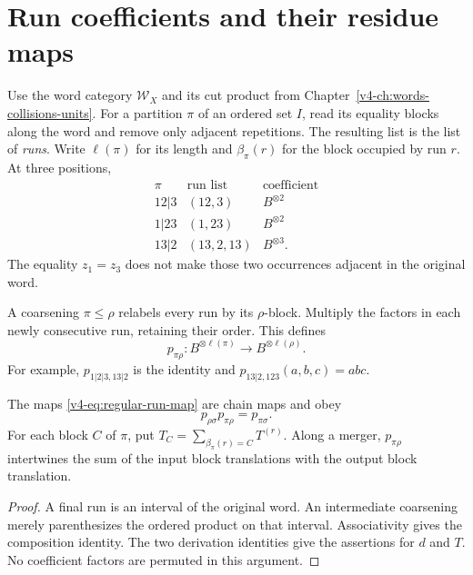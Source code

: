 \section{Run coefficients and their residue maps}
\label{v4-sec:regular-runs}

Use the word category \(\mathcal W_X\) and its cut product
from Chapter~\ref{v4-ch:words-collisions-units}.
For a partition \(\pi\) of an ordered set \(I\), read its
equality blocks along the word and remove only adjacent
repetitions. The resulting list is the list of \emph{runs}.
Write \(\ell(\pi)\) for its length and \(\beta_\pi(r)\)
for the block occupied by run \(r\). At three positions,
\[
 \begin{array}{c|c|c}
 \pi&\text{run list}&\text{coefficient}\\ \hline
 12|3&(12,3)&B^{\otimes2}\\
 1|23&(1,23)&B^{\otimes2}\\
 13|2&(13,2,13)&B^{\otimes3}.
 \end{array}
\]
The equality \(z_1=z_3\) does not make those two occurrences
adjacent in the original word.

A coarsening \(\pi\leq\rho\) relabels every run by its
\(\rho\)-block. Multiply the factors in each newly consecutive
run, retaining their order. This defines
\begin{equation}\label{v4-eq:regular-run-map}
 p_{\pi\rho}:B^{\otimes\ell(\pi)}
       \longrightarrow B^{\otimes\ell(\rho)}.
\end{equation}
For example, \(p_{1|2|3,13|2}\) is the identity and
\(p_{13|2,123}(a,b,c)=abc\).

\begin{lemma}\label{v4-lem:regular-run-functor}
The maps \eqref{v4-eq:regular-run-map} are chain maps and obey
\[
 p_{\rho\sigma}p_{\pi\rho}=p_{\pi\sigma}.
\]
For each block \(C\) of \(\pi\), put
\(T_C=\sum_{\beta_\pi(r)=C}T^{(r)}\).
Along a merger, \(p_{\pi\rho}\) intertwines the sum of
the input block translations with the output block translation.
\end{lemma}

\begin{proof}
A final run is an interval of the original word. An intermediate
coarsening merely parenthesizes the ordered product on that
interval. Associativity gives the composition identity.
The two derivation identities give the assertions for \(d\)
and \(T\). No coefficient factors are permuted in this argument.
\end{proof}

